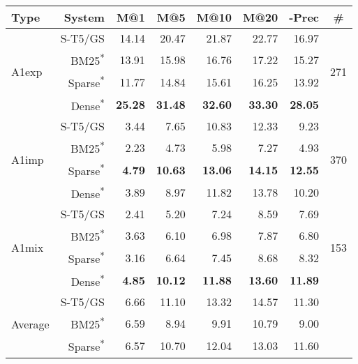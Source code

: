 \documentclass[11pt]{article}
\begin{document}
\begin{table*}[]
    \centering
    \begin{tabular}{l|r|r|r|r|r|r|c}
     Type &  System &  M@1 &  M@5 &  M@10 &  M@20 &  -Prec &  \# \\
    \hline
    \hline
    \multirow{4}{3em}{A1exp} &    S-T5/GS &  14.14 &  20.47 &   21.87 &   22.77 &        16.97 &      \multirow{4}{2em}{271} \\
     &    BM25\textsuperscript{*} &  13.91 &  15.98 &   16.76 &   17.22 &        15.27 &       \\
     &    Sparse\textsuperscript{*} &  11.77 &  14.84 &   15.61 &   16.25 &        13.92 &       \\
     &    Dense\textsuperscript{*} &  \textbf{25.28} &  \textbf{31.48} &   \textbf{32.60} &   \textbf{33.30} &        \textbf{28.05} &       \\
    \hline
    \multirow{4}{3em}{A1imp} &    S-T5/GS &   3.44 &   7.65 &   10.83 &   12.33 &         9.23 &      \multirow{4}{2em}{370} \\
     &    BM25\textsuperscript{*} &   2.23 &   4.73 &    5.98 &    7.27 &         4.93 &       \\
     &    Sparse\textsuperscript{*} &   \textbf{4.79} &  \textbf{10.63} &   \textbf{13.06} &   \textbf{14.15} &        \textbf{12.55} &       \\
     &    Dense\textsuperscript{*} &   3.89 &   8.97 &   11.82 &   13.78 &        10.20 &       \\
    \hline
    \multirow{4}{3em}{A1mix} &    S-T5/GS &   2.41 &   5.20 &    7.24 &    8.59 &         7.69 &      \multirow{4}{2em}{153} \\
     &    BM25\textsuperscript{*} &   3.63 &   6.10 &    6.98 &    7.87 &         6.80 &       \\
     &    Sparse\textsuperscript{*} &   3.16 &   6.64 &    7.45 &    8.68 &         8.32 &       \\
     &    Dense\textsuperscript{*} &   \textbf{4.85} &  \textbf{10.12} &   \textbf{11.88} &   \textbf{13.60} &        \textbf{11.89} &       \\
    \hline
    \hline
     \multirow{4}{2em}{Average} &    S-T5/GS &   6.66 &  11.10 &   13.32 &   14.57 &        11.30 &         \\
      &    BM25\textsuperscript{*} &   6.59 &   8.94 &    9.91 &   10.79 &         9.00 &          \\
      &    Sparse\textsuperscript{*} &   6.57 &  10.70 &   12.04 &   13.03 &        11.60 &         \\

\end{tabular}
\end{table*}
\end{document}
